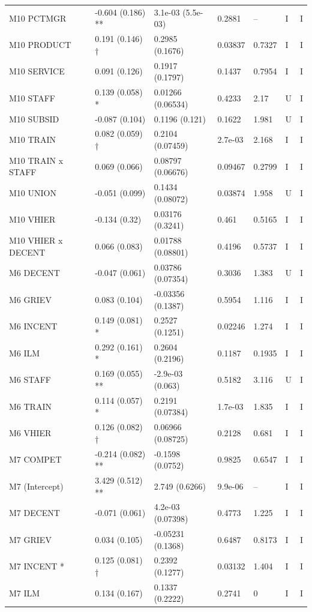 {\begin{longtable}{@{}p{.245\linewidth}p{.17\linewidth}p{.17\linewidth}p{.085\linewidth}p{.060\linewidth}p{.08\linewidth}p{.07\linewidth}@{}}
M10 PCTMGR & -0.604 (0.186) ** & 3.1e-03 (5.5e-03) & 0.2881 & -- & I & I\\
M10 PRODUCT & 0.191 (0.146) † & 0.2985 (0.1676) & 0.03837 & 0.7327 & I & I\\
M10 SERVICE & 0.091 (0.126) & 0.1917 (0.1797) & 0.1437 & 0.7954 & I & I\\
M10 STAFF & 0.139 (0.058) * & 0.01266 (0.06534) & 0.4233 & 2.17 & U & I\\
M10 SUBSID & -0.087 (0.104) & 0.1196 (0.121) & 0.1622 & 1.981 & U & I\\
M10 TRAIN & 0.082 (0.059) † & 0.2104 (0.07459) & 2.7e-03 & 2.168 & I & I\\
M10 TRAIN x STAFF & 0.069 (0.066) & 0.08797 (0.06676) & 0.09467 & 0.2799 & I & I\\
M10 UNION & -0.051 (0.099) & 0.1434 (0.08072) & 0.03874 & 1.958 & U & I\\
M10 VHIER & -0.134 (0.32) & 0.03176 (0.3241) & 0.461 & 0.5165 & I & I\\
M10 VHIER x DECENT & 0.066 (0.083) & 0.01788 (0.08801) & 0.4196 & 0.5737 & I & I\\
M6 DECENT & -0.047 (0.061) & 0.03786 (0.07354) & 0.3036 & 1.383 & U & I\\
M6 GRIEV & 0.083 (0.104) & -0.03356 (0.1387) & 0.5954 & 1.116 & I & I\\
M6 INCENT & 0.149 (0.081) * & 0.2527 (0.1251) & 0.02246 & 1.274 & I & I\\
M6 ILM & 0.292 (0.161) * & 0.2604 (0.2196) & 0.1187 & 0.1935 & I & I\\
M6 STAFF & 0.169 (0.055) ** & -2.9e-03 (0.063) & 0.5182 & 3.116 & U & I\\
M6 TRAIN & 0.114 (0.057) * & 0.2191 (0.07384) & 1.7e-03 & 1.835 & I & I\\
M6 VHIER & 0.126 (0.082) † & 0.06966 (0.08725) & 0.2128 & 0.681 & I & I\\
M7 COMPET & -0.214 (0.082) ** & -0.1598 (0.0752) & 0.9825 & 0.6547 & I & I\\
M7 (Intercept) & 3.429 (0.512) ** & 2.749 (0.6266) & 9.9e-06 & -- & I & I\\
M7 DECENT & -0.071 (0.061) & 4.2e-03 (0.07398) & 0.4773 & 1.225 & I & I\\
M7 GRIEV & 0.034 (0.105) & -0.05231 (0.1368) & 0.6487 & 0.8173 & I & I\\
M7 INCENT * & 0.125 (0.081) † & 0.2392 (0.1277) & 0.03132 & 1.404 & I & I\\
M7 ILM & 0.134 (0.167) & 0.1337 (0.2222) & 0.2741 & 0 & I & I\\

\end{longtable}}
